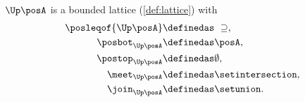 \begin{lemma}
    \label{lem:u_bounded_lat}
    $\Up \posA$ is a bounded lattice (\cref{def:lattice}) with
    \begin{equation}
        \begin{aligned}
            \posleqof{\Up \posA} & \definedas \ \supseteq, \\
            \posbot_{\Up \posA}  & \definedas \posA, \\
            \postop_{\Up \posA}  & \definedas \emptyset, \\
            \meet_{\Up \posA}    & \definedas \setintersection, \\
            \join_{\Up \posA}    & \definedas \setunion.
        \end{aligned}
    \end{equation}
\end{lemma}
